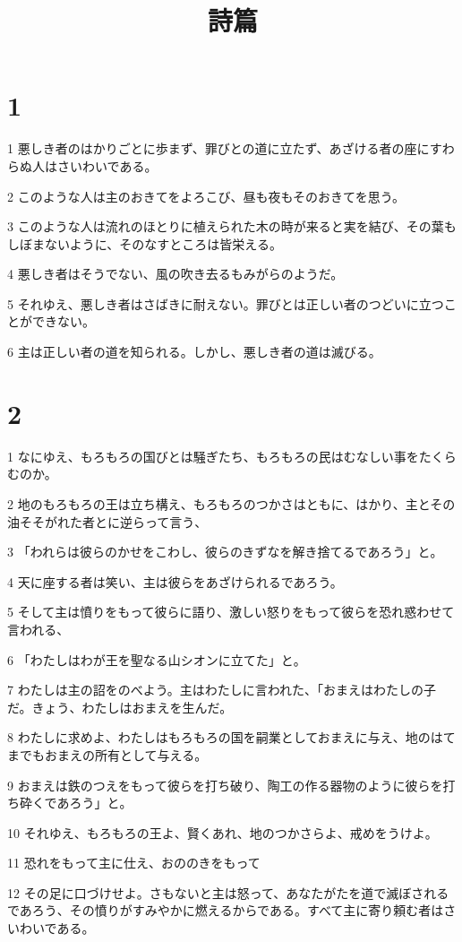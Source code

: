 

\title{詩篇}


\chapter{1}

\par 1 悪しき者のはかりごとに歩まず、罪びとの道に立たず、あざける者の座にすわらぬ人はさいわいである。
\par 2 このような人は主のおきてをよろこび、昼も夜もそのおきてを思う。
\par 3 このような人は流れのほとりに植えられた木の時が来ると実を結び、その葉もしぼまないように、そのなすところは皆栄える。
\par 4 悪しき者はそうでない、風の吹き去るもみがらのようだ。
\par 5 それゆえ、悪しき者はさばきに耐えない。罪びとは正しい者のつどいに立つことができない。
\par 6 主は正しい者の道を知られる。しかし、悪しき者の道は滅びる。

\chapter{2}

\par 1 なにゆえ、もろもろの国びとは騒ぎたち、もろもろの民はむなしい事をたくらむのか。
\par 2 地のもろもろの王は立ち構え、もろもろのつかさはともに、はかり、主とその油そそがれた者とに逆らって言う、
\par 3 「われらは彼らのかせをこわし、彼らのきずなを解き捨てるであろう」と。
\par 4 天に座する者は笑い、主は彼らをあざけられるであろう。
\par 5 そして主は憤りをもって彼らに語り、激しい怒りをもって彼らを恐れ惑わせて言われる、
\par 6 「わたしはわが王を聖なる山シオンに立てた」と。
\par 7 わたしは主の詔をのべよう。主はわたしに言われた、「おまえはわたしの子だ。きょう、わたしはおまえを生んだ。
\par 8 わたしに求めよ、わたしはもろもろの国を嗣業としておまえに与え、地のはてまでもおまえの所有として与える。
\par 9 おまえは鉄のつえをもって彼らを打ち破り、陶工の作る器物のように彼らを打ち砕くであろう」と。
\par 10 それゆえ、もろもろの王よ、賢くあれ、地のつかさらよ、戒めをうけよ。
\par 11 恐れをもって主に仕え、おののきをもって
\par 12 その足に口づけせよ。さもないと主は怒って、あなたがたを道で滅ぼされるであろう、その憤りがすみやかに燃えるからである。すべて主に寄り頼む者はさいわいである。

